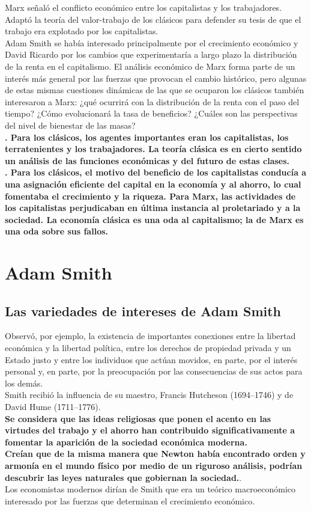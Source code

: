 \documentclass[10pt]{book}
\begin{document}
Marx señaló el conflicto económico entre los capitalistas y los trabajadores. Adaptó la teoría del valor-trabajo de los clásicos para defender su tesis de que el trabajo era explotado por los capitalistas.\\
Adam Smith se había interesado principalmente por el crecimiento económico y David Ricardo por los cambios que experimentaría a largo plazo la distribución de la renta en el capitalismo. El análisis económico de Marx forma parte de un interés más general por las fuerzas que provocan el cambio histórico, pero algunas de estas mismas cuestiones dinámicas de las que se ocuparon los clásicos también interesaron a Marx: ¿qué ocurrirá con la distribución de la renta con el paso del tiempo? ¿Cómo evolucionará la tasa de beneficios? ¿Cuáles son las perspectivas del nivel de bienestar de las masas?\\
\textbf{. Para los clásicos, los agentes importantes eran los capitalistas, los terratenientes y los trabajadores. La teoría clásica es en cierto sentido un análisis de las funciones económicas y del futuro de estas clases.\\
. Para los clásicos, el motivo del beneficio de los capitalistas conducía a una asignación eficiente del capital en la economía y al ahorro, lo cual fomentaba el crecimiento y la riqueza. Para Marx, las actividades de los capitalistas perjudicaban en última instancia al proletariado y a la sociedad. La economía clásica es una oda al capitalismo; la de Marx es una oda sobre sus fallos.}

\chapter{Adam Smith}
\section*{Las variedades de intereses de Adam Smith}
Observó, por ejemplo, la existencia de importantes conexiones entre la libertad económica y la libertad política, entre los derechos de propiedad privada y un Estado justo y entre los individuos que actúan movidos, en parte, por el interés personal y, en parte, por la preocupación por las consecuencias de sus actos para los demás.\\
Smith recibió la influencia de su maestro, Francis Hutcheson (1694–1746) y de David Hume (1711–1776).\\
\textbf{ Se considera que las ideas religiosas que ponen el acento en las virtudes del trabajo y el ahorro han contribuido significativamente a fomentar la aparición de la sociedad económica moderna.}\\
\textbf{Creían que de la misma manera que Newton había encontrado orden y armonía en el mundo físico por medio de un riguroso análisis, podrían descubrir las leyes naturales que gobiernan la sociedad.}.\\
Los economistas modernos dirían de Smith que era un teórico macroeconómico interesado por las fuerzas que determinan el crecimiento económico.
\end{document}
